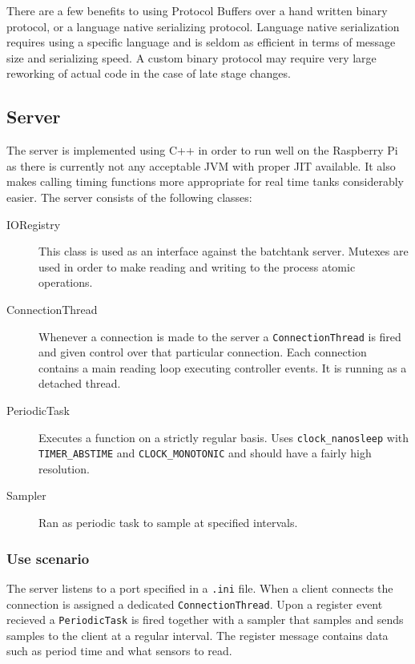 \documentclass{article}
\begin{document}
There are a few benefits to using Protocol Buffers over a hand written
binary protocol, or a language native serializing protocol. Language
native serialization requires using a specific language and is seldom as
efficient in terms of message size and serializing speed. A custom
binary protocol may require very large reworking of actual code in the
case of late stage changes.


\subsection{Server}
The server is implemented using C++ in order to run well on the Raspberry Pi as
there is currently not any acceptable JVM with proper JIT available. It
also makes calling timing functions more appropriate for real time tanks
considerably easier. The server consists of the following classes:

\begin{description}
\item[IORegistry]
  This class is used as an interface against the batchtank server.
  Mutexes are used in order to make reading and writing to the process
  atomic operations.

\item[ConnectionThread]
  Whenever a connection is made to the server a \verb+ConnectionThread+
  is fired and given control over that particular connection. Each
  connection contains a main reading loop executing controller events.
  It is running as a detached thread.

\item[PeriodicTask]
  Executes a function on a strictly regular basis. Uses
  \verb+clock_nanosleep+  with \verb+TIMER_ABSTIME+ and
  \verb+CLOCK_MONOTONIC+ and should have a fairly high resolution.

\item[Sampler]
  Ran as periodic task to sample at specified intervals.
\end{description}

\subsubsection{Use scenario}
The server listens to a port specified in a \verb+.ini+ file. When a client
connects the connection is assigned a dedicated \verb+ConnectionThread+. 
Upon a register event recieved a \verb+PeriodicTask+ is fired together
with a sampler that samples and sends samples to the client at a regular
interval. The register message contains data such as period time and
what sensors to read.
\end{document}
